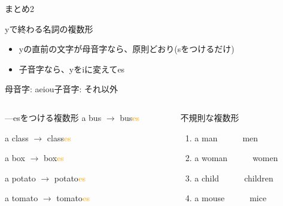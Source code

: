 \documentclass[aspectratio=169,xcolor={dvipsnames,table}]{beamer}
\begin{document}
\begin{frame}[plain]{まとめ2}
 \begin{block}{yで終わる名詞の複数形}
\begin{itemize}[square]
 \item yの直前の文字が母音字なら、原則どおり(sをつけるだけ)\hspace{15pt}\dbend
 \item \phantom{yの直前の文字が}子音字なら、yをiに変えてes 
\end{itemize}
\hfill{\scriptsize 母音字: aeiou\hspace{10pt}子音字: それ以外}
\end{block}

\pause

\begin{columns}
\begin{column}{.45\textwidth}
\begin{block}{---esをつける複数形}
a bus $\longrightarrow$ bus\textcolor{orange}{es}%
\hfill{}\hspace*{25pt}

a class $\longrightarrow$ class\textcolor{orange}{es}
\hfill{}\hspace*{25pt}

a box  $\longrightarrow$ box\textcolor{orange}{es}
\hfill{}\hspace*{25pt}

a potato $\longrightarrow$ potato\textcolor{orange}{es}
\hfill{}\hspace*{25pt}

a tomato $\longrightarrow$ tomato\textcolor{orange}{es}
\hfill{}\hspace*{25pt}
\end{block}
\end{column}
\pause
\begin{column}{.45\textwidth}
\begin{block}{不規則な複数形}
 \begin{enumerate}
 \item a man~~~\rightarrow{}~~~men
 \item a woman~~~\rightarrow{}~~~women
 \item a child~~~\rightarrow{}~~~children
 \item a mouse~~~\rightarrow{}~~~mice
  \end{enumerate}
\end{block}
\end{column}
\end{columns}
\end{frame}
\end{document}

